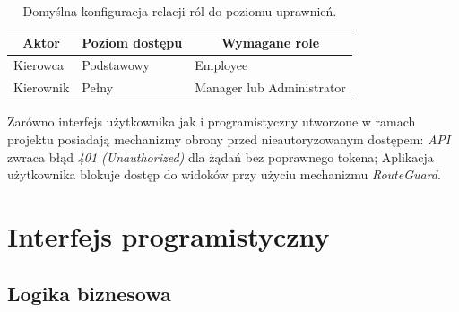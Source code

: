 \documentclass[eng,printmode,openany]{mgr}
\begin{document}
	
	\begin{table}[H]
		\caption{Domyślna konfiguracja relacji ról do poziomu uprawnień.}
		\begin{tabularx}{\textwidth}{|l|l|X|}
			\hline
			\multicolumn{1}{|c|}{\textbf{Aktor}} & \multicolumn{1}{c|}{\textbf{Poziom dostępu}} & \multicolumn{1}{c|}{\textbf{Wymagane role}} \\ \hline
			Kierowca                             & Podstawowy                                   & Employee                                    \\ \hline
			Kierownik                            & Pełny                                        & Manager lub Administrator                   \\ \hline
		\end{tabularx}
	\end{table}
	
	Zarówno interfejs użytkownika jak i programistyczny utworzone w ramach projektu posiadają mechanizmy obrony przed nieautoryzowanym dostępem: \textit{API} zwraca błąd \textit{401 (Unauthorized)} dla żądań bez poprawnego tokena; Aplikacja użytkownika blokuje dostęp do widoków przy użyciu mechanizmu \textit{RouteGuard}.
	
	\newpage
	\section{Interfejs programistyczny}
	\subsection{Logika biznesowa}
	
\end{document}
